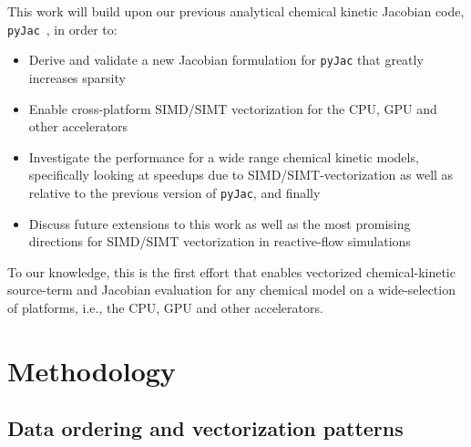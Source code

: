 \documentclass[12pt,number,sort&compress,preprint]{elsarticle}
\begin{document}
This work will build upon our previous analytical chemical kinetic Jacobian code, \texttt{pyJac}~\cite{Niemeyer:2016aa}, in order to:
\begin{itemize}
 \item Derive and validate a new Jacobian formulation for \texttt{pyJac} that greatly increases sparsity
 \item Enable cross-platform SIMD\slash SIMT vectorization for the CPU, GPU and other accelerators
 \item Investigate the performance for a wide range chemical kinetic models, specifically looking at speedups due to SIMD\slash SIMT-vectorization as well as relative to the previous version of \texttt{pyJac}, and finally
 \item Discuss future extensions to this work as well as the most promising directions for SIMD\slash SIMT vectorization in reactive-flow simulations
\end{itemize}
To our knowledge, this is the first effort that enables vectorized chemical-kinetic source-term and Jacobian evaluation for any chemical model on a wide-selection of platforms, i.e., the CPU, GPU and other accelerators.

\section{Methodology}
\subsection{Data ordering and vectorization patterns}
\label{S:data}
\end{document}
